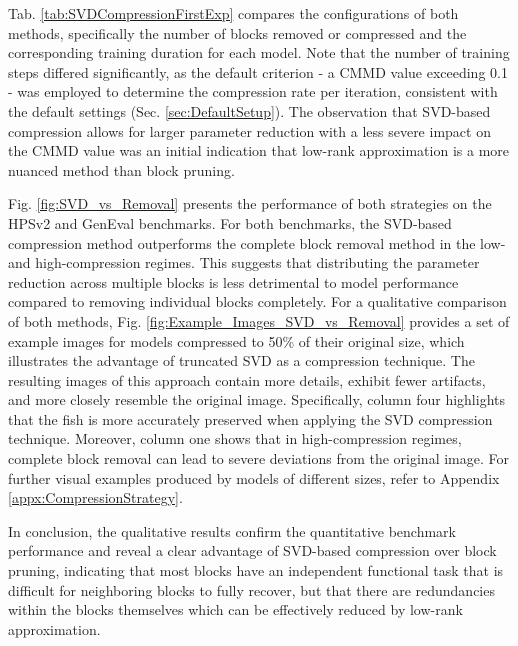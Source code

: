  
 
  Tab. \ref{tab:SVDCompressionFirstExp} compares the configurations of both methods, specifically the number of blocks removed or compressed and the corresponding training duration for each model. Note that the number of training steps differed significantly, as the default criterion - a \gls{CMMD} value exceeding 0.1 - was employed to determine the compression rate per iteration, consistent with the default settings (Sec. \ref{sec:DefaultSetup}). The observation that \gls{SVD}-based compression allows for larger parameter reduction with a less severe impact on the \gls{CMMD} value was an initial indication that low-rank approximation is a more nuanced method than block pruning. 
  
  Fig. \ref{fig:SVD_vs_Removal} presents the performance of both strategies on the HPSv2 and GenEval benchmarks. For both benchmarks, the \gls{SVD}-based compression method outperforms the complete block removal method in the low- and high-compression regimes. This suggests that distributing the parameter reduction across multiple blocks is less detrimental to model performance compared to removing individual blocks completely.
  For a qualitative comparison of both methods, Fig. \ref{fig:Example_Images_SVD_vs_Removal} provides a set of example images for models compressed to 50\% of their original size, which illustrates the advantage of truncated \gls{SVD} as a compression technique. The resulting images of this approach contain more details, exhibit fewer artifacts, and more closely resemble the original image. Specifically, column four highlights that the fish is more accurately preserved when applying the \gls{SVD} compression technique. Moreover, column one shows that in high-compression regimes, complete block removal can lead to severe deviations from the original image. For further visual examples produced by models of different sizes, refer to Appendix \ref{appx:CompressionStrategy}.
   
  In conclusion, the qualitative results confirm the quantitative benchmark performance and reveal a clear advantage of \gls{SVD}-based compression over block pruning, indicating that most blocks have an independent functional task that is difficult for neighboring blocks to fully recover, but that there are redundancies within the blocks themselves which can be effectively reduced by low-rank approximation.
  
  \vspace{1cm}
 
